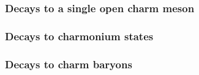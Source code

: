 \subsubsection{Decays to a single open charm meson}






\subsubsection{Decays to charmonium states}






\subsubsection{Decays to charm baryons}








